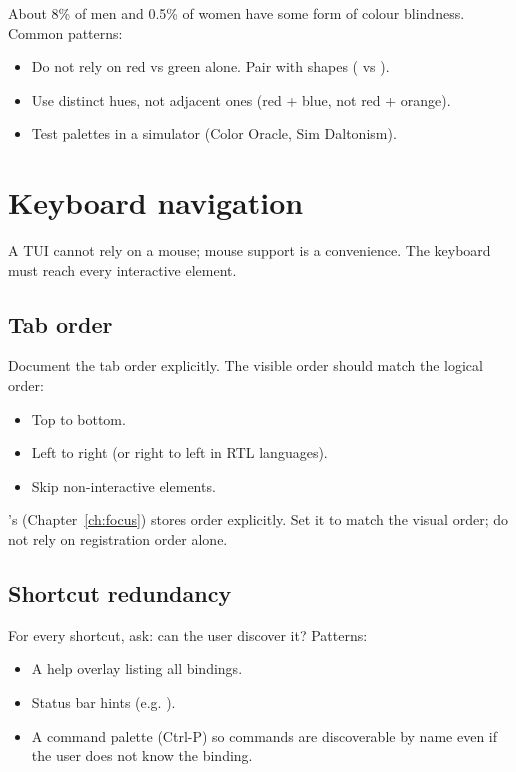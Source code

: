 About 8\% of men and 0.5\% of women have some form of colour
blindness. Common patterns:

\begin{itemize}[leftmargin=*]
  \item Do not rely on red vs green alone. Pair with shapes
    (\code{[+]} vs \code{[-]}).
  \item Use distinct hues, not adjacent ones (red + blue, not
    red + orange).
  \item Test palettes in a simulator (Color Oracle, Sim Daltonism).
\end{itemize}

\section{Keyboard navigation}

A TUI cannot rely on a mouse; mouse support is a convenience.
The keyboard must reach every interactive element.

\subsection*{Tab order}

Document the tab order explicitly. The visible order should
match the logical order:

\begin{itemize}[leftmargin=*]
  \item Top to bottom.
  \item Left to right (or right to left in RTL languages).
  \item Skip non-interactive elements.
\end{itemize}

\maya{}'s  (Chapter~\ref{ch:focus}) stores
order explicitly. Set it to match the visual order; do not
rely on registration order alone.

\subsection*{Shortcut redundancy}

For every shortcut, ask: can the user discover it? Patterns:

\begin{itemize}[leftmargin=*]
  \item A help overlay listing all bindings.
  \item Status bar hints (e.g. ).
  \item A command palette (Ctrl-P) so commands are discoverable
    by name even if the user does not know the binding.
\end{itemize}

